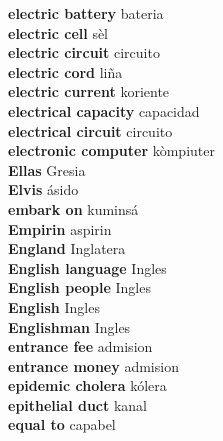 \textbf{ electric battery  } bateria \\
\textbf{ electric cell  } sèl \\
\textbf{ electric circuit  } circuito \\
\textbf{ electric cord  } liña \\
\textbf{ electric current  } koriente \\
\textbf{ electrical capacity  } capacidad \\
\textbf{ electrical circuit  } circuito \\
\textbf{ electronic computer  } kòmpiuter \\
\textbf{ Ellas  } Gresia \\
\textbf{ Elvis  } ásido \\
\textbf{ embark on  } kuminsá \\
\textbf{ Empirin  } aspirin \\
\textbf{ England  } Inglatera \\
\textbf{ English language  } Ingles \\
\textbf{ English people  } Ingles \\
\textbf{ English  } Ingles \\
\textbf{ Englishman  } Ingles \\
\textbf{ entrance fee  } admision \\
\textbf{ entrance money  } admision \\
\textbf{ epidemic cholera  } kólera \\
\textbf{ epithelial duct  } kanal \\
\textbf{ equal to  } capabel \\

